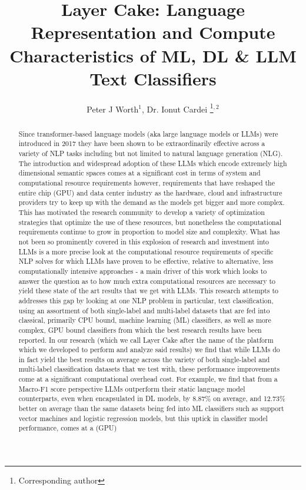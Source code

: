 \documentclass[final]{clv2025}
\begin{document}
\title{Layer Cake: Language Representation and Compute Characteristics of ML, DL \& LLM Text Classifiers}

\author{Peter J Worth$^{1}$, Dr. Ionut Cardei \thanks{Corresponding author}$^{,2}$}


\maketitle

\begin{abstract}
Since transformer-based language models (aka large language models or LLMs) were introduced in 2017 they have been shown to be extraordinarily effective across a variety of NLP tasks including but not limited to natural language generation (NLG). The introduction and widespread adoption of these LLMs which encode extremely high dimensional semantic spaces comes at a significant cost in terms of  system and computational resource requirements however, requirements that have reshaped the entire chip (GPU) and data center industry as the hardware, cloud and infrastructure providers try to keep up with the demand as the models get bigger and more complex. This has motivated the research community to develop a variety of optimization strategies that optimize the use of these resources, but nonetheless the computational requirements continue to grow in proportion to model size and complexity. What has not been so prominently covered in this explosion of research and investment into LLMs is a more precise look at the computational resource requirements of specific NLP solves for which LLMs have proven to be effective, relative to alternative, less computationally intensive approaches - a main driver of this work which looks to answer the question as to how much extra computational resources are necessary to yield these state of the art results that we get with LLMs. This research attempts to addresses this gap by looking at one NLP problem in particular, text classification, using an assortment of both single-label and multi-label datasets that are fed into classical, primarily CPU bound, machine learning (ML) classifiers, as well as more complex, GPU bound classifiers from which the best research results have been reported. In our research (which we call Layer Cake after the name of the platform which we developed to perform and analyze said results) we find that while LLMs do in fact yield the best results on average across the variety of both single-label and multi-label classification datasets that we test with, these performance improvements come at a significant computational overhead cost. For example, we find that from a Macro-F1 score perspective LLMs outperform their static language model counterparts, even when encapsulated in DL models, by 8.87\% on average, and 12.73\% better on average than the same datasets being fed into  ML classifiers such as support vector machines and logistic regression models, but this uptick in classifier model performance, comes at a (GPU) 
\end{abstract}
\end{document}
